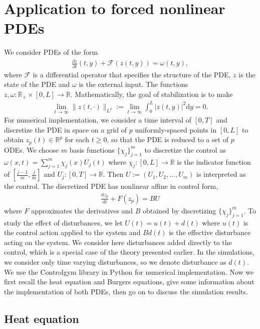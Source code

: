 \documentclass[10pt,a4paper]{amsart}
\newcommand{\R}{\mathbb{R}}
\newcommand{\ud}{\mathrm{d}}
\begin{document}
\section{Application to forced nonlinear PDEs}
\label{sec:pde}
We consider PDEs of the form
\begin{align*}
    \frac{\partial z}{\partial t}(t,y) + \mathcal{F}(z(t,y)) = \omega(t,y),
\end{align*}
where $\mathcal{F}$ is a differential operator that specifies the structure of the PDE, $z$ is the state of the PDE and $\omega$ is the external input. The functions $z, \omega : \R_+ \times [0,L] \to \R$. Mathematically, the goal of stabilization is to make 
\begin{align}\label{eq:L2objective}
\lim_{t \to \infty}\|z(t,\cdot)\|_{L^2} := \lim_{t \to \infty}\int_{0}^{L} |z(t,y)|^2 \ud y = 0.    
\end{align}
For numerical implementation, we consider a time interval of $[0,T]$ and discretize the PDE in space on a grid of $p$ uniformly-spaced points in $[0,L]$ to obtain $z_p(t) \in \R^p$ for each $t \ge 0$, so that the PDE is reduced to a set of $p$ ODEs. We choose $m$ basis functions $\{\chi_j\}_{j=1}^{m}$ to discretize the control as 
$\omega(x,t) = \sum_{j=1}^m \chi_j(x) U_j(t)$ where $\chi_j : [0,L] \to \R$ is the indicator function of $[\frac{j-1}{m},\frac{j}{m}]$ and $U_j : [0,T] \to \R$. 
Then $U := (U_1,U_2,\ldots,U_m)$ is interpreted as the control. The discretized PDE has nonlinear affine in control form,
\begin{align}
\frac{\ud z_p}{\ud t} + F(z_p) = BU
\label{eq:discrete-pde}
\end{align}
where $F$ approximates the derivatives and $B$ obtained by discretizing $\{\chi_j\}_{j=1}^{m}$. To study the effect of disturbances, we let $U(t) = u(t) + d(t)$ where $u(t)$ is the control action applied to the system and $Bd(t)$ is the effective disturbance acting on the system. We consider here disturbances added directly to the control, which is a special case of the theory presented earlier. In the simulations, we consider only time varying disturbances, so we denote disturbance as $d(t)$. 
We use the Controlgym library in Python \cite{zhang2023controlgym} for numerical implementation. 
Now we first recall the heat equation and Burgers equations, give some information about the implementation of both PDEs, then go on to discuss the simulation results.
\subsection{Heat equation}
\end{document}

